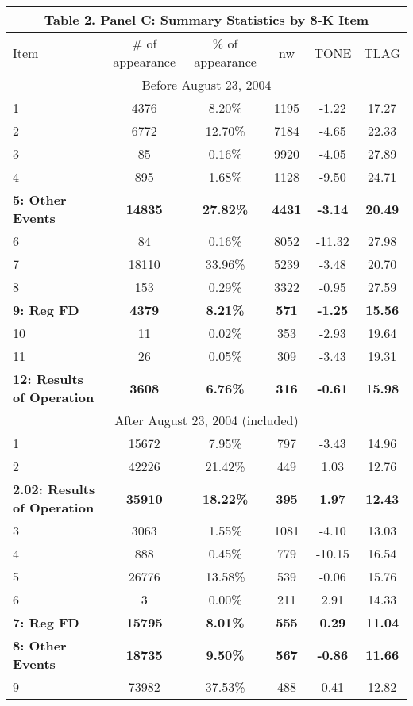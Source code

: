 \begin{table}[H]   \label{T2PC}%
  \centering
    \begin{tabular}{lccccc}
    \multicolumn{6}{c}{\textbf{Table 2. Panel C: Summary Statistics by 8-K Item}} \\
    \midrule
    \midrule
    Item & \multicolumn{1}{c}{\# of appearance} & \multicolumn{1}{c}{\% of appearance} & \multicolumn{1}{c}{nw} & \multicolumn{1}{c}{TONE} & \multicolumn{1}{c}{TLAG} \\
    \midrule
    \multicolumn{6}{c}{Before August 23, 2004} \\
    \midrule
    1 & 4376 & 8.20\% & 1195 & -1.22 & 17.27 \\
    2 & 6772 & 12.70\% & 7184 & -4.65 & 22.33 \\
    3 & 85 & 0.16\% & 9920 & -4.05 & 27.89 \\
    4 & 895 & 1.68\% & 1128 & -9.50 & 24.71 \\
    \textbf{5: Other Events} & \textbf{14835} & \textbf{27.82\%} & \textbf{4431} & \textbf{-3.14} & \textbf{20.49} \\
    6 & 84 & 0.16\% & 8052 & -11.32 & 27.98 \\
    7 & 18110 & 33.96\% & 5239 & -3.48 & 20.70 \\
    8 & 153 & 0.29\% & 3322 & -0.95 & 27.59 \\
    \textbf{9: Reg FD} & \textbf{4379} & \textbf{8.21\%} & \textbf{571} & \textbf{-1.25} & \textbf{15.56} \\
    10 & 11 & 0.02\% & 353 & -2.93 & 19.64 \\
    11 & 26 & 0.05\% & 309 & -3.43 & 19.31 \\
    \textbf{12: Results of Operation} & \textbf{3608} & \textbf{6.76\%} & \textbf{316} & \textbf{-0.61} & \textbf{15.98} \\
    \midrule
    \multicolumn{6}{c}{After August 23, 2004 (included)} \\
    \midrule
    1 & 15672 & 7.95\% & 797 & -3.43 & 14.96 \\
    2 & 42226 & 21.42\% & 449 & 1.03 & 12.76 \\
    \textbf{2.02: Results of Operation} & \textbf{35910} & \textbf{18.22\%} & \textbf{395} & \textbf{1.97} & \textbf{12.43} \\
    3 & 3063 & 1.55\% & 1081 & -4.10 & 13.03 \\
    4 & 888 & 0.45\% & 779 & -10.15 & 16.54 \\
    5 & 26776 & 13.58\% & 539 & -0.06 & 15.76 \\
    6 & 3 & 0.00\% & 211 & 2.91 & 14.33 \\
    \textbf{7: Reg FD} & \textbf{15795} & \textbf{8.01\%} & \textbf{555} & \textbf{0.29} & \textbf{11.04} \\
    \textbf{8: Other Events} & \textbf{18735} & \textbf{9.50\%} & \textbf{567} & \textbf{-0.86} & \textbf{11.66} \\
    9 & 73982 & 37.53\% & 488 & 0.41 & 12.82 \\
    \bottomrule
    \bottomrule
    \end{tabular}%
\end{table}%
